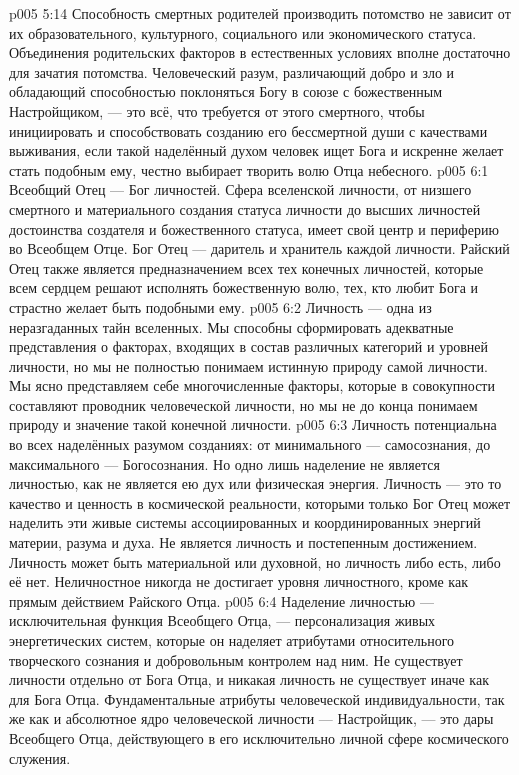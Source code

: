 \vs p005 5:14 Способность смертных родителей производить потомство не зависит от их образовательного, культурного, социального или экономического статуса. Объединения родительских факторов в естественных условиях вполне достаточно для зачатия потомства. Человеческий разум, различающий добро и зло и обладающий способностью поклоняться Богу в союзе с божественным Настройщиком, --- это всё, что требуется от этого смертного, чтобы инициировать и способствовать созданию его бессмертной души с качествами выживания, если такой наделённый духом человек ищет Бога и искренне желает стать подобным ему, честно выбирает творить волю Отца небесного.
\vs p005 6:1 Всеобщий Отец --- Бог личностей. Сфера вселенской личности, от низшего смертного и материального создания статуса личности до высших личностей достоинства создателя и божественного статуса, имеет свой центр и периферию во Всеобщем Отце. Бог Отец --- даритель и хранитель каждой личности. Райский Отец также является предназначением всех тех конечных личностей, которые всем сердцем решают исполнять божественную волю, тех, кто любит Бога и страстно желает быть подобными ему.
\vs p005 6:2 \pc Личность --- одна из неразгаданных тайн вселенных. Мы способны сформировать адекватные представления о факторах, входящих в состав различных категорий и уровней личности, но мы не полностью понимаем истинную природу самой личности. Мы ясно представляем себе многочисленные факторы, которые в совокупности составляют проводник человеческой личности, но мы не до конца понимаем природу и значение такой конечной личности.
\vs p005 6:3 Личность потенциальна во всех наделённых разумом созданиях: от минимального --- самосознания, до максимального --- Богосознания. Но одно лишь наделение не является личностью, как не является ею дух или физическая энергия. Личность --- это то качество и ценность в космической реальности, которыми только Бог Отец может наделить эти живые системы ассоциированных и координированных энергий материи, разума и духа. Не является личность и постепенным достижением. Личность может быть материальной или духовной, но личность либо есть, либо её нет. Неличностное никогда не достигает уровня личностного, кроме как прямым действием Райского Отца.
\vs p005 6:4 Наделение личностью --- исключительная функция Всеобщего Отца, --- персонализация живых энергетических систем, которые он наделяет атрибутами относительного творческого сознания и добровольным контролем над ним. Не существует личности отдельно от Бога Отца, и никакая личность не существует иначе как для Бога Отца. Фундаментальные атрибуты человеческой индивидуальности, так же как и абсолютное ядро человеческой личности --- Настройщик, --- это дары Всеобщего Отца, действующего в его исключительно личной сфере космического служения.
